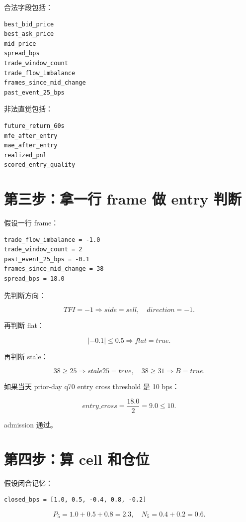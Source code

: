 合法字段包括：

\begin{lstlisting}
best_bid_price
best_ask_price
mid_price
spread_bps
trade_window_count
trade_flow_imbalance
frames_since_mid_change
past_event_25_bps
\end{lstlisting}

非法直觉包括：

\begin{lstlisting}
future_return_60s
mfe_after_entry
mae_after_entry
realized_pnl
scored_entry_quality
\end{lstlisting}


\section{第三步：拿一行 frame 做 entry 判断}

假设一行 frame：

\begin{lstlisting}
trade_flow_imbalance = -1.0
trade_window_count = 2
past_event_25_bps = -0.1
frames_since_mid_change = 38
spread_bps = 18.0
\end{lstlisting}

先判断方向：

\[
TFI=-1 \Rightarrow side=sell,\quad direction=-1.
\]

再判断 flat：

\[
|-0.1|\le0.5 \Rightarrow flat=true.
\]

再判断 stale：

\[
38\ge25 \Rightarrow stale25=true,\quad 38\ge31 \Rightarrow B=true.
\]

如果当天 prior-day q70 entry cross threshold 是 10 bps：

\[
entry\_cross=\frac{18.0}{2}=9.0\le10.
\]

admission 通过。

\section{第四步：算 cell 和仓位}

假设闭合记忆：

\begin{lstlisting}
closed_bps = [1.0, 0.5, -0.4, 0.8, -0.2]
\end{lstlisting}

\[
P_5=1.0+0.5+0.8=2.3,
\quad
N_5=0.4+0.2=0.6.
\]

